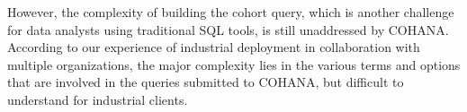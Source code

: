 However, the complexity of building the cohort query, which is another challenge for data analysts using traditional SQL tools, is still unaddressed by COHANA. According to our experience of industrial deployment in collaboration with multiple organizations, the major complexity lies in the various terms and options that are involved in the queries submitted to COHANA, but difficult to understand for industrial clients.







